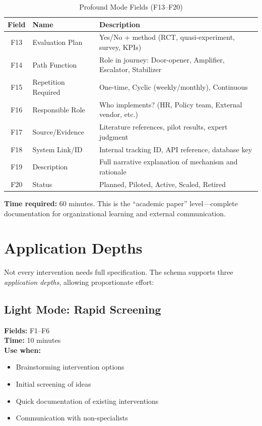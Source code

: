 \begin{table}[htbp]
\centering
\caption{Profound Mode Fields (F13--F20)}
\label{tab:17-profound-fields}
\renewcommand{\arraystretch}{1.3}
\small
\begin{tabular}{@{}clp{8cm}@{}}
\toprule
\textbf{Field} & \textbf{Name} & \textbf{Description} \\
\midrule
F13 & Evaluation Plan & Yes/No + method (RCT, quasi-experiment, survey, KPIs) \\
F14 & Path Function & Role in journey: Door-opener, Amplifier, Escalator, Stabilizer \\
F15 & Repetition Required & One-time, Cyclic (weekly/monthly), Continuous \\
F16 & Responsible Role & Who implements? (HR, Policy team, External vendor, etc.) \\
F17 & Source/Evidence & Literature references, pilot results, expert judgment \\
F18 & System Link/ID & Internal tracking ID, API reference, database key \\
F19 & Description & Full narrative explanation of mechanism and rationale \\
F20 & Status & Planned, Piloted, Active, Scaled, Retired \\
\bottomrule
\end{tabular}
\end{table}

\textbf{Time required:} 60 minutes. This is the ``academic paper'' level---complete documentation for organizational learning and external communication.


\section{Application Depths}
\label{sec:17-depths}

Not every intervention needs full specification. The schema supports three \textit{application depths}, allowing proportionate effort:

\subsection{Light Mode: Rapid Screening}

\textbf{Fields:} F1--F6\\
\textbf{Time:} 10 minutes\\
\textbf{Use when:}
\begin{itemize}[nosep]
\item Brainstorming intervention options
\item Initial screening of ideas
\item Quick documentation of existing interventions
\item Communication with non-specialists
\end{itemize}

